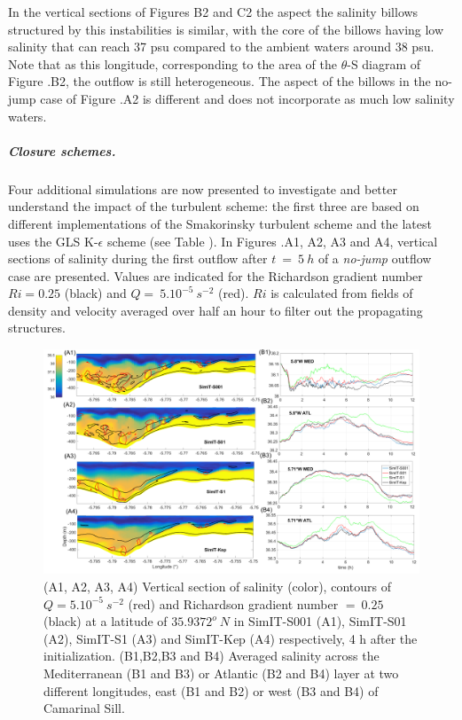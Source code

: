 In the vertical sections of Figures B2 and C2 the aspect the salinity billows structured by this instabilities is similar, with the core of the billows having low salinity that can reach 37 psu compared to the ambient waters around 38 psu. Note that as this longitude, corresponding to the area of the $\theta$-S diagram of Figure .B2, the outflow is still heterogeneous. The aspect of the billows in the no-jump case of Figure .A2 is different and does not incorporate as much low salinity waters.


\subparagraph{Closure schemes.}

Four additional simulations are now presented to investigate and better understand the impact of the turbulent scheme: the first three are based on different implementations of the Smakorinsky turbulent scheme and the latest uses the GLS K-$\epsilon$ scheme (see Table ). 
In Figures .A1, A2, A3 and A4, vertical sections of salinity during the first outflow after $t\ =\ 5\ h$ of a \textit{no-jump} outflow case are presented. Values are indicated for the Richardson gradient number $Ri=0.25$ (black) and $Q =\ 5.10^{-5} \ s^{-2}$ (red). $Ri$ is calculated from fields of density and velocity averaged over half an hour to filter out the propagating structures.

\begin{figure}[!h]
 \includegraphics[width=\textwidth]{./GBR3D/Figsmago.png}
 \caption [Vertical section of salinity and averaged salinity in atlantic and mediterranean layers.]{ (A1, A2, A3, A4) Vertical section of salinity (color), contours of $Q = 5.10^{-5} \ s^{-2}$ (red) and Richardson gradient number $=\ 0.25$ (black) at a latitude of $35.9372^o\ N$ in SimIT-S001 (A1), SimIT-S01 (A2), SimIT-S1 (A3) and SimIT-Kep (A4) respectively, 4 h after the initialization. (B1,B2,B3 and B4) Averaged salinity across the Mediterranean (B1 and B3) or Atlantic (B2 and B4) layer at two different longitudes, east (B1 and B2) or west (B3 and B4) of Camarinal Sill.}
 \label{Fig3Dsch}
\end{figure}

